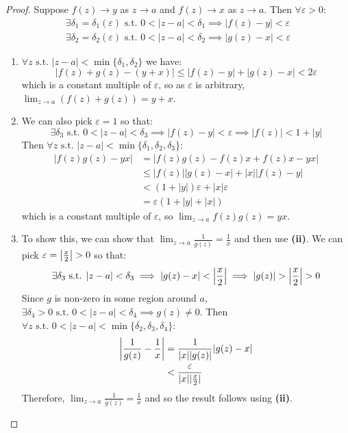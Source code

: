 \documentclass[../main.tex]{subfiles}
\begin{document}
\begin{proof}
  Suppose $f(z) \to y$ as $z \to a$ and $f(z) \to x$ as $z \to a$.
  Then $\forall \varepsilon > 0$:
  \begin{align*}
    \exists \delta_1 = \delta_1(\varepsilon) \text{ s.t. } 0 < |z - a| < \delta_1 \implies |f(z) - y| < \varepsilon \\
    \exists \delta_2 = \delta_2(\varepsilon) \text{ s.t. } 0 < |z - a| < \delta_2 \implies |g(z) - x| < \varepsilon
  \end{align*}
  \begin{enumerate}
    \item $\forall z \text{ s.t. } |z - a| < \min\{\delta_1, \delta_2\}$ we have:
      \[
        |f(z) + g(z) - (y + x)| \leq |f(z) - y| + |g(z) - x| < 2\varepsilon
      \]
      which is a constant multiple of $\varepsilon$, so as $\varepsilon$ is arbitrary, $\lim_{z \to a} (f(z) + g(z)) = y + x$.
    \item We can also pick $\varepsilon = 1$ so that:
      \[
        \exists \delta_3 \text{ s.t. } 0 < |z - a| < \delta_3 \implies |f(z) - y| < \varepsilon \implies |f(z)| < 1 + |y|
      \]
      Then $\forall z \text{ s.t. } |z - a| < \min\{\delta_1, \delta_2, \delta_3\}$:
      \begin{align*}
        |f(z)g(z) - yx| &= |f(z)g(z) - f(z)x + f(z)x - yx| \\
                        &\leq |f(z)||g(z) - x| + |x||f(z) - y| \\
                        &< (1 + |y|)\varepsilon + |x|\varepsilon \\
                        &= \varepsilon(1 + |y| + |x|)
      \end{align*}
      which is a constant multiple of $\varepsilon$, so $\lim_{z \to a} f(z)g(z) = yx$.
    \item To show this, we can show that $\lim_{z \to a} \frac{1}{g(z)} = \frac{1}{x}$ and then use \textbf{(ii)}.
      We can pick $\varepsilon = \left\lvert \frac{x}{2} \right\rvert > 0$ so that:
      \[
        \exists \delta_3 \text{ s.t. } |z - a| < \delta_3 \implies |g(z) - x| < \left\lvert \frac{x}{2} \right\rvert \implies |g(z)| > \left\lvert \frac{x}{2} \right\rvert > 0
      \]
      Since $g$ is non-zero in some region around $a$, $\exists \delta_4 > 0 \text{ s.t. } 0 < |z - a| < \delta_4 \implies g(z) \neq 0$.
      Then $\forall z \text{ s.t. } 0 < |z - a| < \min\{\delta_2, \delta_3, \delta_4\}$:
      \begin{align*}
        \left\lvert \frac{1}{g(z)} - \frac{1}{x} \right\rvert &= \frac{1}{|x||g(z)|}|g(z) - x| \\
                                       &< \frac{\varepsilon}{|x||\frac{x}{2}|}
      \end{align*}
      Therefore, $\lim_{z \to a} \frac{1}{g(z)} = \frac{1}{x}$ and so the result follows using \textbf{(ii)}.
      \end{enumerate}
\end{proof}
\end{document}
